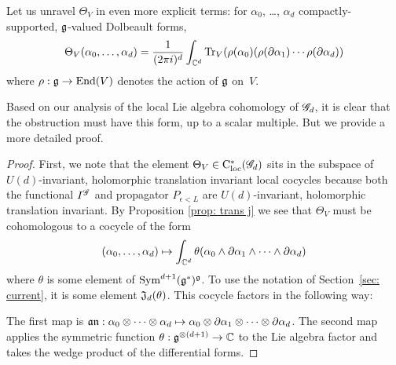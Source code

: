 Let us unravel $\Theta_V$ in even more explicit terms:
for $\alpha_0$, \dots, $\alpha_d$ compactly-supported, $\mathfrak g$-valued Dolbeault forms,
\[
\Theta_V(\alpha_0, \ldots, \alpha_d) = \frac{1}{(2\pi i)^d} \int_{\mathbb C^d} {\rm Tr}_V(\rho(\alpha_0) (\rho(\partial\alpha_1) \cdots \rho(\partial \alpha_d))
\]
where $\rho: \mathfrak g \to {\rm End}(V)$ denotes the action of $\mathfrak g$ on~$V$.

Based on our analysis of the local Lie algebra cohomology of $\mathscr G_d$, 
it is clear that the obstruction must have this form, up to a scalar multiple. 
But we provide a more detailed proof.

\begin{proof}
First, we note that the element $\Theta_V \in {\rm C}_{\rm loc}^*(\mathscr G_d)$ sits in the subspace of $U(d)$-invariant, holomorphic translation invariant local cocycles because both the functional $I^{\mathscr G}$ and propagator $P_{\epsilon<L}$ are $U(d)$-invariant, holomorphic translation invariant.
By Proposition \ref{prop: trans j} we see that $\Theta_V$ must be cohomologous to a cocycle of the form
\[
(\alpha_0, \ldots, \alpha_d) \mapsto \int_{\mathbb C^d} \theta(\alpha_0 \wedge \partial \alpha_1 \wedge \cdots \wedge \partial \alpha_d) 
\]
where $\theta$ is some element of ${\rm Sym}^{d+1}(\mathfrak g^*)^\mathfrak g$.
To use the notation of Section~\ref{sec: current}, it is some element $\mathfrak J_d (\theta)$. 
This cocycle factors in the following way:
\beqn
\label{composition}
\eeqn
The first map is $\mathfrak a \mathfrak n : \alpha_0 \otimes \cdots \otimes \alpha_d \mapsto \alpha_0 \otimes \partial \alpha_1 \otimes \cdots \otimes \partial \alpha_d$.
The second map applies the symmetric function $\theta : \mathfrak g^{\otimes (d+1)} \to \mathbb C$ to the Lie algebra factor and takes the wedge product of the differential forms. 


\end{proof}

